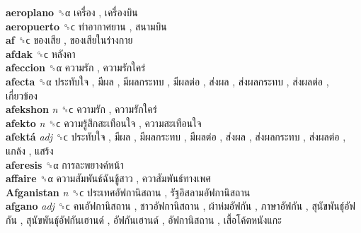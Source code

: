 \textbf{aeroplano} ␝α   เครื่อง ,  เครื่องบิน   \\
\textbf{aeropuerto} ␝ϲ   ท่าอากาศยาน ,  สนามบิน   \\
\textbf{af} ␝ϲ   ของเสีย ,  ของเสียในร่างกาย   \\
\textbf{afdak} ␝ϲ   หลังคา   \\
\textbf{afeccion} ␝α   ความรัก ,  ความรักใคร่   \\
\textbf{afecta} ␝α   ประทับใจ ,  มีผล ,  มีผลกระทบ ,  มีผลต่อ ,  ส่งผล ,  ส่งผลกระทบ ,  ส่งผลต่อ ,  เกี่ยวข้อง   \\
\textbf{afekshon} \emph{n}  ␝ϲ   ความรัก ,  ความรักใคร่   \\
\textbf{afekto} \emph{n}  ␝ϲ   ความรู้สึกสะเทือนใจ ,  ความสะเทือนใจ   \\
\textbf{afektá} \emph{adj}  ␝ϲ   ประทับใจ ,  มีผล ,  มีผลกระทบ ,  มีผลต่อ ,  ส่งผล ,  ส่งผลกระทบ ,  ส่งผลต่อ ,  แกล้ง ,  แสร้ง   \\
\textbf{aferesis} ␝α   การละพยางค์หน้า   \\
\textbf{affaire} ␝α   ความสัมพันธ์ฉันชู้สาว ,  ควาสัมพันธ์ทางเพศ   \\
\textbf{Afganistan} \emph{n}  ␝ϲ   ประเทศอัฟกานิสถาน ,  รัฐอิสลามอัฟกานิสถาน   \\
\textbf{afgano} \emph{adj}  ␝ϲ   คนอัฟกานิสถาน ,  ชาวอัฟกานิสถาน ,  ผ้าห่มอัฟกัน ,  ภาษาอัฟกัน ,  สุนัขพันธุ์อัฟกัน ,  สุนัขพันธุ์อัฟกันเฮานด์ ,  อัฟกันเฮานด์ ,  อัฟกานิสถาน ,  เสื้อโค้ตหนังแกะ   \\
